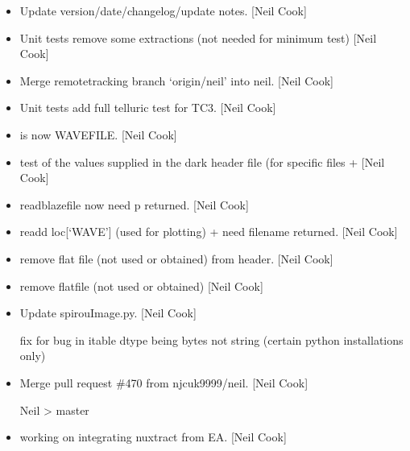 \documentclass[a4paper,10pt,english]{report}
\begin{document}
\begin{itemize}
\item {} 
Update version/date/changelog/update notes. {[}Neil Cook{]}

\item {} 
Unit tests \sphinxhyphen{} remove some extractions (not needed for minimum test)
{[}Neil Cook{]}

\item {} 
Merge remote\sphinxhyphen{}tracking branch ‘origin/neil’ into neil. {[}Neil Cook{]}

\item {} 
Unit tests \sphinxhyphen{} add full telluric test for TC3. {[}Neil Cook{]}

\item {} 
 \sphinxhyphen{}  is now WAVEFILE. {[}Neil Cook{]}

\item {} 
 \sphinxhyphen{} test of the values supplied in the dark header file
(for specific files +  {[}Neil Cook{]}

\item {} 
 \sphinxhyphen{} readblazefile now need p returned. {[}Neil Cook{]}

\item {} 
 \sphinxhyphen{} re\sphinxhyphen{}add loc{[}‘WAVE’{]} (used for plotting) +
 need filename returned. {[}Neil Cook{]}

\item {} 
 \sphinxhyphen{} remove flat file (not used or obtained) from
header. {[}Neil Cook{]}

\item {} 
 \sphinxhyphen{} remove flatfile (not used or obtained) {[}Neil
Cook{]}

\item {} 
Update spirouImage.py. {[}Neil Cook{]}

 \sphinxhyphen{} fix for bug in itable dtype being bytes not string (certain python installations only)

\item {} 
Merge pull request \#470 from njcuk9999/neil. {[}Neil Cook{]}

Neil \textendash{}\textgreater{} master

\item {} 
 \sphinxhyphen{} working on integrating nuxtract from EA. {[}Neil
Cook{]}


\end{itemize}
\end{document}
